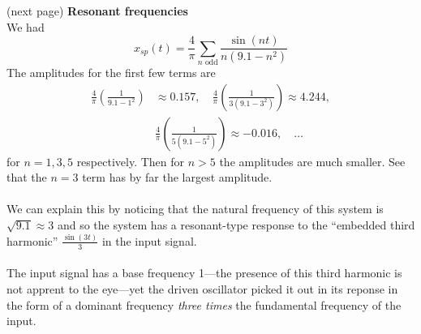 \documentclass{report}
\begin{document}
(next page)\newpage
\noindent\textbf{Resonant frequencies}\\
We had
\begin{equation*}
x_{sp}(t)=\frac{4}{\pi}\sum_{n\text{ odd}}\frac{\sin(nt)}{n(9.1-n^2)}
\end{equation*}
The amplitudes for the first few terms are
\begin{align*}
\frac{4}{\pi}\left(\frac{1}{9.1-1^2}\right)&\approx0.157,\quad\frac{4}{\pi}\left(\frac{1}{3(9.1-3^2)}\right)
\approx4.244,\\&\frac{4}{\pi}\left(\frac{1}{5(9.1-5^2)}\right)\approx-0.016,\quad\ldots
\end{align*}
for $n=1,3,5$ respectively. Then for $n>5$ the amplitudes are much smaller. See that the $n=3$ term has by far the
largest amplitude.\\
\vspace{1mm}\\
We can explain this by noticing that the natural frequency of this system is $\sqrt{9.1}\approx3$ and
so the system has a resonant-type response to the
``embedded third harmonic'' $\frac{\sin(3t)}{3}$ in the input signal.\\
\vspace{1mm}\\
The input signal has a base frequency 1---the presence of this third harmonic is not apprent to the eye---yet 
the driven oscillator picked it out in its reponse in the form of a dominant frequency \textit{three times} the
fundamental frequency of the input.
\newpage
\end{document}

